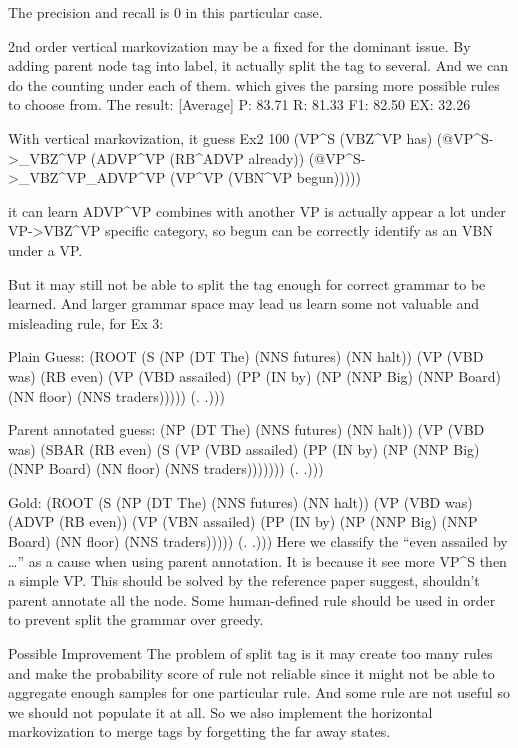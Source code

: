 \documentclass[letterpaper]{article}
\begin{document}
The precision and recall is 0 in this particular case.

2nd order vertical markovization may be a fixed for the dominant issue. By adding parent node tag into label, it actually split the tag to several. And we can do the counting under each of them. which gives the parsing more possible rules to choose from.
The result: [Average]    P: 83.71   R: 81.33   F1: 82.50   EX: 32.26

With vertical markovization, it guess Ex2 100%
(VP^S (VBZ^VP has)
        (@VP^S->_VBZ^VP
         	 (ADVP^VP (RB^ADVP already))
          	 (@VP^S->_VBZ^VP_ADVP^VP
            	(VP^VP (VBN^VP begun)))))

it can learn ADVP^VP combines with another VP is actually appear a lot under VP->VBZ^VP specific category, so begun can be correctly identify as an VBN under a VP.

But it may still not be able to split the tag enough for correct grammar to be learned. And larger grammar space may lead us learn some not valuable and misleading rule, for Ex 3:

Plain Guess:
(ROOT
  (S
    (NP (DT The) (NNS futures) (NN halt))
    (VP (VBD was) (RB even)
      (VP (VBD assailed)
        (PP (IN by)
          (NP (NNP Big) (NNP Board) (NN floor) (NNS traders)))))
    (. .)))

Parent annotated guess:
    (NP (DT The) (NNS futures) (NN halt))
    (VP (VBD was)
      (SBAR (RB even)
        (S
          (VP (VBD assailed)
            (PP (IN by)
              (NP (NNP Big) (NNP Board) (NN floor) (NNS traders)))))))
    (. .)))

Gold:
(ROOT
  (S
    (NP (DT The) (NNS futures) (NN halt))
    (VP (VBD was)
      (ADVP (RB even))
      (VP (VBN assailed)
        (PP (IN by)
          (NP (NNP Big) (NNP Board) (NN floor) (NNS traders)))))
    (. .)))
Here we classify the “even assailed by …” as a cause when using parent annotation. It is because it see more VP^S then a simple VP. This should be solved by the reference paper suggest, shouldn’t parent annotate all the node. Some human-defined rule should be used in order to prevent split the grammar over greedy.




Possible Improvement
The problem of split tag is it may create too many rules and make the probability score of rule not reliable since it might not be able to aggregate enough samples for one particular rule. And some rule are not useful so we should not populate it at all. So we also implement the horizontal markovization to merge tags by forgetting the far away states.
\end{document}
